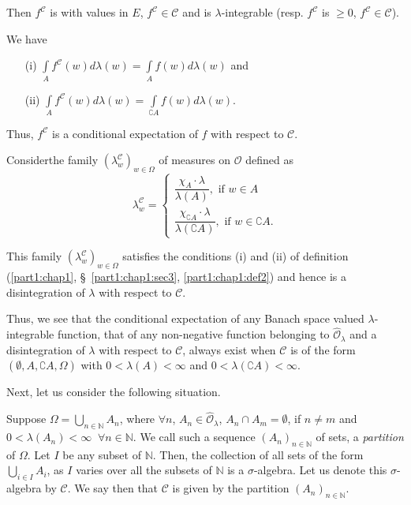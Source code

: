 Then $f^\mathscr{C}$ is with values in $E$, $f^\mathscr{C} \in
\mathscr{C}$ and is $\lambda$-integrable (resp. $f^\mathscr{C}$ is
$\geq 0$, $f^\mathscr{C} \in \mathscr{C}$).

We have 
\begin{itemize}
\item[{\rm (i)}] $\int\limits_A f^\mathscr{C} (w) d \lambda (w) =
  \int\limits_A f(w) d \lambda(w)$ \quad and 


\item[{\rm (ii)}] $\int\limits_A f^\mathscr{C} (w) d \lambda (w) =
  \int\limits_{\complement A} f(w) d \lambda (w)$. 
\end{itemize}

Thus, $f^\mathscr{C}$ is a conditional expectation of $f$ with respect
to $\mathscr{C}$. 

Consider\pageoriginale the family $(\lambda^\mathscr{C}_w)_{w \in
  \Omega}$ of measures on $\mathscr{O}$ defined as
$$ 
\lambda^\mathscr{C}_w = 
\begin{cases}
\dfrac{\chi_A \cdot \lambda }{\lambda(A)}, \text{ if } w \in  A\\[5pt]
\dfrac{\chi_{\complement A} \cdot \lambda}{\lambda(\complement A)}, \text{ if } w \in \complement A. 
\end{cases}
$$

This family $(\lambda^\mathscr{C}_w)_{w \in \Omega}$ satisfies the
conditions (i) and (ii) of definition (\ref{part1:chap1}, \S\ \ref{part1:chap1:sec3}, \ref{part1:chap1:def2}) and hence is a 
disintegration of $\lambda$ with respect to $\mathscr{C}$. 

Thus, we see that the conditional expectation of any Banach space
valued $\lambda$-integrable function, that of any non-negative
function belonging to $\hat{\mathscr{O}}_\lambda$ and a disintegration
of $\lambda$ with respect to $\mathscr{C}$, always exist when
$\mathscr{C}$ is of the form $(\emptyset, A, \complement A, \Omega)$
with $0 < \lambda(A) < \infty$ and $0 < \lambda (\complement A ) <
\infty$. 

Next, let us consider the following situation. 

Suppose $\Omega = \bigcup\limits_{n \in\mathbb{N}} A_n$, where
$\forall n $, $A_n \in\hat{\mathscr{O}}_\lambda$, $A_n \cap A_m =
\emptyset$, if $n \neq m$ and $0 < \lambda (A_n) < \infty \; \; \forall n
\in \mathbb{N}$. We call such a sequence $(A_n)_{n \in \mathbb{N}}$ of
sets, a \textit{partition} of $\Omega$. Let $I$ be any subset of
$\mathbb{N}$. Then, the collection of all sets of the form
$\bigcup\limits_{i \in I} A_i$, as $I$ varies over all the subsets of
$\mathbb{N}$  is a $\sigma$-algebra. Let us denote this
$\sigma$-algebra by $\mathscr{C}$. We say then that $\mathscr{C}$ is
given by the partition $(A_n)_{n \in\mathbb{N}}$.


